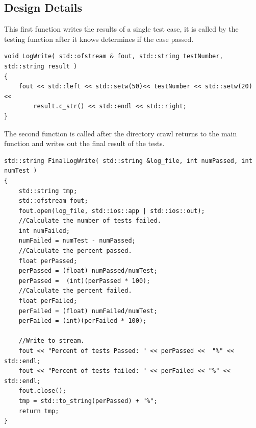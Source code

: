 \subsection{Design Details}
This first function writes the results of a single test case, it is called by the testing function after it knows determines if the case
passed.
\begin{lstlisting}
void LogWrite( std::ofstream & fout, std::string testNumber, std::string result )
{
    fout << std::left << std::setw(50)<< testNumber << std::setw(20) <<
        result.c_str() << std::endl << std::right;
}
\end{lstlisting}
The second function is called after the directory crawl returns to the main function and writes out the final result of the tests.
\begin{lstlisting}
std::string FinalLogWrite( std::string &log_file, int numPassed, int numTest )
{
    std::string tmp;
    std::ofstream fout;
    fout.open(log_file, std::ios::app | std::ios::out);
    //Calculate the number of tests failed.
    int numFailed;
    numFailed = numTest - numPassed;
    //Calculate the percent passed.
    float perPassed;
    perPassed = (float) numPassed/numTest;
    perPassed =  (int)(perPassed * 100);
    //Calculate the percent failed.
    float perFailed;
    perFailed = (float) numFailed/numTest;
    perFailed = (int)(perFailed * 100);

    //Write to stream.
    fout << "Percent of tests Passed: " << perPassed <<  "%" << std::endl;
    fout << "Percent of tests failed: " << perFailed << "%" << std::endl;
    fout.close();
    tmp = std::to_string(perPassed) + "%";
    return tmp;
}
\end{lstlisting}


